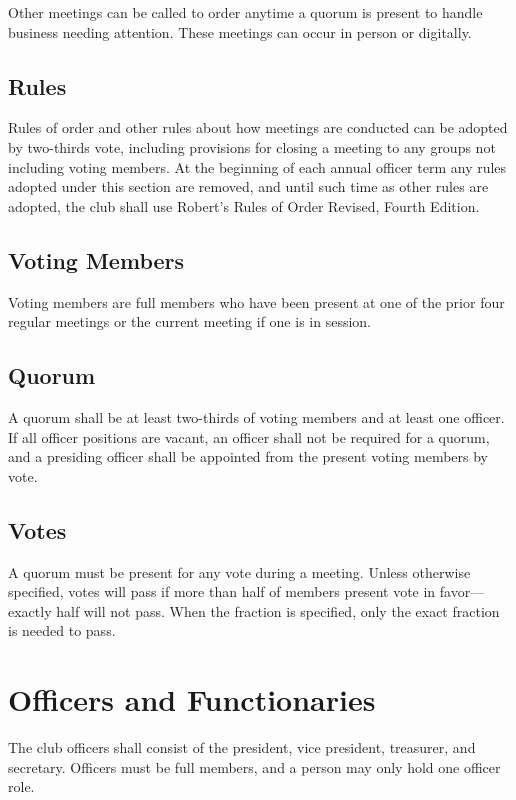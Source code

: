 \documentclass{article}
\begin{document}
Other meetings can be called to order anytime a quorum is present to handle
business needing attention. These meetings can occur in person or digitally.

\subsection{Rules}

Rules of order and other rules about how meetings are conducted can be adopted
by two-thirds vote, including provisions for closing a meeting to any groups not
including voting members. At the beginning of each annual officer term any rules
adopted under this section are removed, and until such time as other rules are
adopted, the club shall use Robert's Rules of Order Revised, Fourth Edition.

\subsection{Voting Members}

Voting members are full members who have been present at one of the prior four
regular meetings or the current meeting if one is in session.

\subsection{Quorum}

A quorum shall be at least two-thirds of voting members and at least one
officer. If all officer positions are vacant, an officer shall not be required
for a quorum, and a presiding officer shall be appointed from the present voting
members by vote.

\subsection{Votes}

A quorum must be present for any vote during a meeting. Unless otherwise
specified, votes will pass if more than half of members present vote in
favor---exactly half will not pass. When the fraction is specified, only the
exact fraction is needed to pass.

\section{Officers and Functionaries}

The club officers shall consist of the president, vice president, treasurer, and
secretary. Officers must be full members, and a person may only hold one officer
role.
\end{document}
